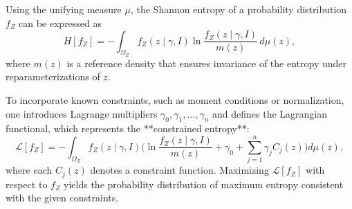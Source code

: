 Using the unifying measure $\mu$, the Shannon entropy of a probability distribution $f_Z$ can be expressed as
\begin{equation}
	H[f_Z] = - \int_{\Omega_Z} f_Z(z \mid \gamma, I) 
	\ln \frac{f_Z(z \mid \gamma, I)}{m(z)} \, d\mu(z),
\end{equation}
where $m(z)$ is a reference density that ensures invariance of the entropy under reparameterizations of $z$. 

To incorporate known constraints, such as moment conditions or normalization, one introduces Lagrange multipliers $\gamma_0, \gamma_1, \dots, \gamma_n$ and defines the Lagrangian functional, which represents the **constrained entropy**:
\begin{equation}
	\mathcal{L}[f_Z] = - \int_{\Omega_Z} 
	f_Z(z \mid \gamma, I) \Bigg(
	\ln \frac{f_Z(z \mid \gamma, I)}{m(z)}
	+ \gamma_0 + \sum_{j=1}^n \gamma_j C_j(z)
	\Bigg) d\mu(z),
\end{equation}
where each $C_j(z)$ denotes a constraint function. Maximizing $\mathcal{L}[f_Z]$ with respect to $f_Z$ yields the probability distribution of maximum entropy consistent with the given constraints.



